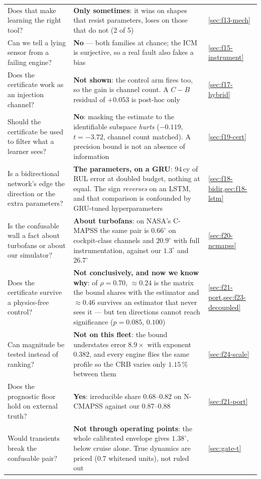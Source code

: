 \begin{center}
\begin{tabular}{@{}>{\raggedright\arraybackslash}p{}>{\raggedright\arraybackslash}p{}>{\raggedright\arraybackslash}p{}@{}}
  Does that make learning the right tool? & \textbf{Only sometimes}: it wins on shapes that
    resist parameters, loses on those that do not (2 of 5) & \cref{sec:f13-mech} \\
  Can we tell a lying sensor from a failing engine? & \textbf{No} --- both families at chance;
    the ICM is surjective, so a real fault also fakes a bias & \cref{sec:f15-instrument} \\
  Does the certificate work as an injection channel? & \textbf{Not shown}: the control
    arm fires too, so the gain is channel count. A $C-B$ residual of $+0.053$ is
    post-hoc only & \cref{sec:f17-hybrid} \\
  Should the certificate be used to filter what a learner sees? & \textbf{No}: masking the
    estimate to the identifiable subspace \emph{hurts} ($-0.119$, $t=-3.72$, channel count
    matched). A precision bound is not an absence of information & \cref{sec:f19-cert} \\
  Is a bidirectional network's edge the direction or the extra parameters? &
    \textbf{The parameters, on a GRU}: $94$\,cy of RUL error at doubled budget, nothing
    at equal. The sign \emph{reverses} on an LSTM, and that comparison is confounded by
    GRU-tuned hyperparameters & \cref{sec:f18-bidir,sec:f18-lstm} \\
  Is the confusable wall a fact about turbofans or about our simulator? & \textbf{About
    turbofans}: on NASA's C-MAPSS the same pair is $0.66^{\circ}$ on cockpit-class channels
    and $20.9^{\circ}$ with full instrumentation, against our $1.3^{\circ}$ and
    $26.7^{\circ}$ & \cref{sec:f20-ncmapss} \\
  Does the certificate survive a physics-free control? & \textbf{Not conclusively, and now we
    know why}: of $\rho=0.70$, $\approx0.24$ is the matrix the bound shares with the estimator
    and $\approx0.46$ survives an estimator that never sees it --- but ten directions cannot
    reach significance ($p=0.085$, $0.100$) & \cref{sec:f21-port,sec:f23-decoupled} \\
  Can magnitude be tested instead of ranking? & \textbf{Not on this fleet}: the bound
    understates error $8.9\times$ with exponent $0.382$, and every engine flies the same
    profile so the CRB varies only $1.15\,\%$ between them & \cref{sec:f24-scale} \\
  Does the prognostic floor hold on external truth? & \textbf{Yes}: irreducible share
    $0.68$--$0.82$ on N-CMAPSS against our $0.87$--$0.88$ & \cref{sec:f21-port} \\
  Would transients break the confusable pair? & \textbf{Not through operating points}: the
    whole calibrated envelope gives $1.38^{\circ}$, below cruise alone. True dynamics are
    priced ($0.7$ whitened units), not ruled out & \cref{sec:gate-t} \\
  \bottomrule
\end{tabular}
\end{center}

